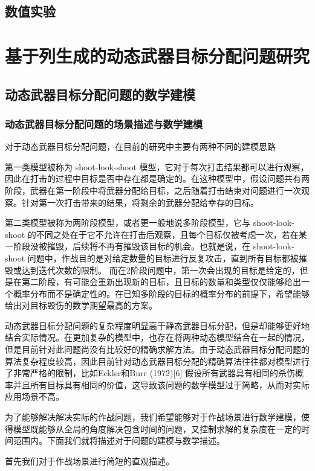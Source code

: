 \section{数值实验}

\chapter{基于列生成的动态武器目标分配问题研究}
\section{动态武器目标分配问题的数学建模}
\subsection{动态武器目标分配问题的场景描述与数学建模}
对于动态武器目标分配问题，在目前的研究中主要有两种不同的建模思路

第一类模型被称为 shoot-look-shoot 模型，它对于每次打击结果都可以进行观察，因此在打击的过程中目标是否中存在都是确定的。在这种模型中，假设问题共有两阶段，武器在第一阶段中将武器分配给目标，之后随着打击结束对问题进行一次观察。针对第一次打击带来的结果，将剩余的武器分配给幸存的目标。

第二类模型被称为两阶段模型，或者更一般地说多阶段模型，它与 shoot-look-shoot 的不同之处在于它不允许在打击后观察，且每个目标仅被考虑一次，若在某一阶段没被摧毁，后续将不再有摧毁该目标的机会。也就是说，在 shoot-look-shoot 问题中，作战目的是对给定数量的目标进行反复攻击，直到所有目标都被摧毁或达到迭代次数的限制。 而在2阶段问题中，第一次会出现的目标是给定的，但是在第二阶段，有可能会重新出现新的目标，且目标的数量和类型仅仅能够给出一个概率分布而不是确定性的。在已知多阶段的目标的概率分布的前提下，希望能够给出对目标毁伤的数学期望最高的方案。

动态武器目标分配问题的复杂程度明显高于静态武器目标分配，但是却能够更好地结合实际情况。在更加复杂的模型中，也存在将两种动态模型结合在一起的情况，但是目前针对此问题尚没有比较好的精确求解方法。由于动态武器目标分配问题的算法复杂程度较高，因此目前针对动态武器目标分配的精确算法往往都对模型进行了非常严格的限制，比如Eckler和Burr (1972)[6] 假设所有武器具有相同的杀伤概率并且所有目标具有相同的价值，这导致该问题的数学模型过于简略，从而对实际应用场景不高。

为了能够解决解决实际的作战问题，我们希望能够对于作战场景进行数学建模，使得模型既能够从全局的角度解决包含时间的问题，又控制求解的复杂度在一定的时间范围内。下面我们就将描述对于问题的建模与数学描述。

首先我们对于作战场景进行简短的直观描述。

